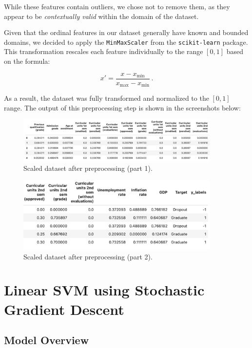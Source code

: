 \documentclass[12pt]{article}
\begin{document}
While these features contain outliers, we chose not to remove them, as they appear to be \textit{contextually valid} within the domain of the dataset. 

Given that the ordinal features in our dataset generally have known and bounded domains, we decided to apply the \texttt{MinMaxScaler} from the \texttt{scikit-learn} package. This transformation rescales each feature individually to the range \([0,1]\) based on the formula:

\[
x' = \frac{x - x_{\text{min}}}{x_{\text{max}} - x_{\text{min}}}\, .
\]

As a result, the dataset was fully transformed and normalized to the \([0,1]\) range. The output of this preprocessing step is shown in the screenshots below:

\begin{figure}[H]
    \centering
    \includegraphics[width=0.9\textwidth]{./processed-data1.png}
    \caption{Scaled dataset after preprocessing (part 1).}
    \label{fig:proc1}
\end{figure}

\begin{figure}[H]
    \centering
    \includegraphics[width=0.9\textwidth]{./processed-data2.png}
    \caption{Scaled dataset after preprocessing (part 2).}
    \label{fig:proc2}
\end{figure}

\section{Linear SVM using Stochastic Gradient Descent}

\subsection{Model Overview}
\end{document}
